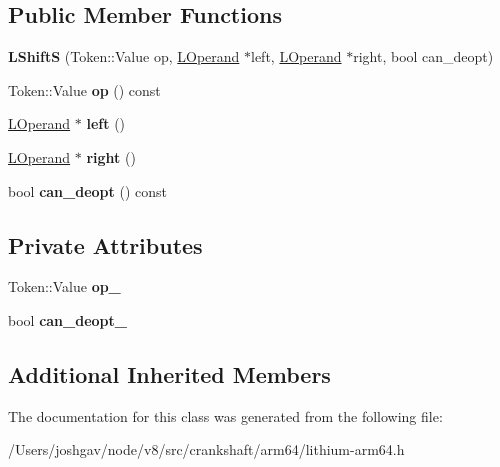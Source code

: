 \subsection*{Public Member Functions}
\begin{DoxyCompactItemize}
\item 
{\bfseries L\+ShiftS} (Token\+::\+Value op, \hyperlink{classv8_1_1internal_1_1_l_operand}{L\+Operand} $\ast$left, \hyperlink{classv8_1_1internal_1_1_l_operand}{L\+Operand} $\ast$right, bool can\+\_\+deopt)\hypertarget{classv8_1_1internal_1_1_l_shift_s_aa87a8859fe72ba4ba0a886a577aa890d}{}\label{classv8_1_1internal_1_1_l_shift_s_aa87a8859fe72ba4ba0a886a577aa890d}

\item 
Token\+::\+Value {\bfseries op} () const \hypertarget{classv8_1_1internal_1_1_l_shift_s_a23e047dac2a114b031501a59b6815de0}{}\label{classv8_1_1internal_1_1_l_shift_s_a23e047dac2a114b031501a59b6815de0}

\item 
\hyperlink{classv8_1_1internal_1_1_l_operand}{L\+Operand} $\ast$ {\bfseries left} ()\hypertarget{classv8_1_1internal_1_1_l_shift_s_adc972423a2c49e24e0d2f97446f558e5}{}\label{classv8_1_1internal_1_1_l_shift_s_adc972423a2c49e24e0d2f97446f558e5}

\item 
\hyperlink{classv8_1_1internal_1_1_l_operand}{L\+Operand} $\ast$ {\bfseries right} ()\hypertarget{classv8_1_1internal_1_1_l_shift_s_acdb48bdeb1169d5f3ea2e0396e3c463a}{}\label{classv8_1_1internal_1_1_l_shift_s_acdb48bdeb1169d5f3ea2e0396e3c463a}

\item 
bool {\bfseries can\+\_\+deopt} () const \hypertarget{classv8_1_1internal_1_1_l_shift_s_a7b7ff5c7708810a1584fe4d6951d000d}{}\label{classv8_1_1internal_1_1_l_shift_s_a7b7ff5c7708810a1584fe4d6951d000d}

\end{DoxyCompactItemize}
\subsection*{Private Attributes}
\begin{DoxyCompactItemize}
\item 
Token\+::\+Value {\bfseries op\+\_\+}\hypertarget{classv8_1_1internal_1_1_l_shift_s_a78ba4d04fd3b935fbc2a3e8e90f2598b}{}\label{classv8_1_1internal_1_1_l_shift_s_a78ba4d04fd3b935fbc2a3e8e90f2598b}

\item 
bool {\bfseries can\+\_\+deopt\+\_\+}\hypertarget{classv8_1_1internal_1_1_l_shift_s_a9ab61e22cd7f559a9d39515db609e62a}{}\label{classv8_1_1internal_1_1_l_shift_s_a9ab61e22cd7f559a9d39515db609e62a}

\end{DoxyCompactItemize}
\subsection*{Additional Inherited Members}


The documentation for this class was generated from the following file\+:\begin{DoxyCompactItemize}
\item 
/\+Users/joshgav/node/v8/src/crankshaft/arm64/lithium-\/arm64.\+h\end{DoxyCompactItemize}

